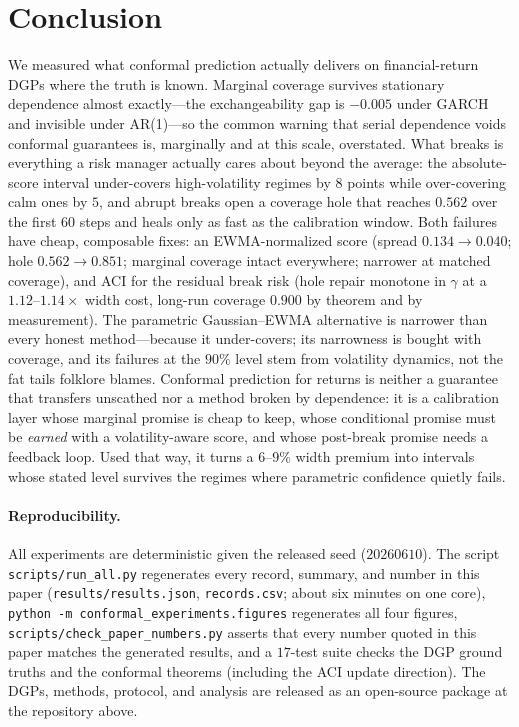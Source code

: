 \documentclass[11pt]{article}
\begin{document}
\section{Conclusion}
\label{sec:conclusion}

We measured what conformal prediction actually delivers on financial-return
DGPs where the truth is known. Marginal coverage survives stationary
dependence almost exactly---the exchangeability gap is $-0.005$ under GARCH
and invisible under AR(1)---so the common warning that serial dependence
voids conformal guarantees is, marginally and at this scale, overstated.
What breaks is everything a risk manager actually cares about beyond the
average: the absolute-score interval under-covers high-volatility regimes by
$8$ points while over-covering calm ones by $5$, and abrupt breaks open a
coverage hole that reaches $0.562$ over the first $60$ steps and heals only
as fast as the calibration window. Both failures have cheap, composable
fixes: an EWMA-normalized score (spread $0.134\to0.040$; hole
$0.562\to0.851$; marginal coverage intact everywhere; narrower at matched
coverage), and ACI for the residual break risk (hole repair monotone in
$\gamma$ at a $1.12$--$1.14\times$ width cost, long-run coverage $0.900$ by
theorem and by measurement). The parametric Gaussian--EWMA alternative is
narrower than every honest method---because it under-covers; its narrowness
is bought with coverage, and its failures at the $90\%$ level stem from
volatility dynamics, not the fat tails folklore blames. Conformal prediction
for returns is neither a guarantee that transfers unscathed nor a method
broken by dependence: it is a calibration layer whose marginal promise is
cheap to keep, whose conditional promise must be \emph{earned} with a
volatility-aware score, and whose post-break promise needs a feedback loop.
Used that way, it turns a $6$--$9\%$ width premium into intervals whose
stated level survives the regimes where parametric confidence quietly fails.

\paragraph{Reproducibility.} All experiments are deterministic given the
released seed ($20260610$). The script \texttt{scripts/run\_all.py}
regenerates every record, summary, and number in this paper
(\texttt{results/results.json}, \texttt{records.csv}; about six minutes on one
core), \texttt{python -m conformal\_experiments.figures} regenerates all four
figures, \texttt{scripts/check\_paper\_numbers.py} asserts that every number
quoted in this paper matches the generated results, and a $17$-test suite
checks the DGP ground truths and the conformal theorems (including the ACI
update direction). The DGPs, methods, protocol, and analysis are released as
an open-source package at the repository above.

\small


\end{document}
